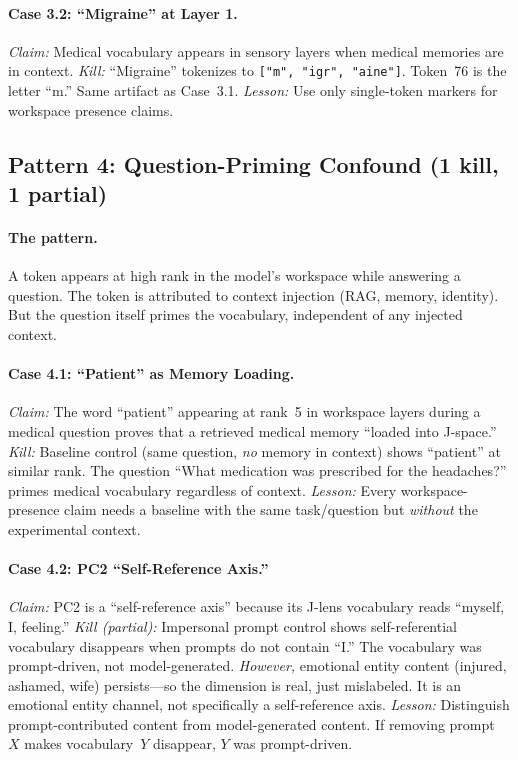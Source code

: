 \documentclass[11pt,a4paper]{article}
\begin{document}
\paragraph{Case 3.2: ``Migraine'' at Layer 1.}
\emph{Claim:} Medical vocabulary appears in sensory layers when medical
memories are in context.
\emph{Kill:} ``Migraine'' tokenizes to \texttt{["m", "igr", "aine"]}.
Token~76 is the letter ``m.'' Same artifact as Case~3.1.
\emph{Lesson:} Use only single-token markers for workspace presence
claims.

\subsection{Pattern 4: Question-Priming Confound (1 kill, 1 partial)}

\paragraph{The pattern.} A token appears at high rank in the model's
workspace while answering a question. The token is attributed to context
injection (RAG, memory, identity). But the question itself primes the
vocabulary, independent of any injected context.

\paragraph{Case 4.1: ``Patient'' as Memory Loading.}
\emph{Claim:} The word ``patient'' appearing at rank~5 in workspace
layers during a medical question proves that a retrieved medical memory
``loaded into J-space.''
\emph{Kill:} Baseline control (same question, \emph{no} memory in
context) shows ``patient'' at similar rank. The question ``What
medication was prescribed for the headaches?'' primes medical vocabulary
regardless of context.
\emph{Lesson:} Every workspace-presence claim needs a baseline with the
same task/question but \emph{without} the experimental context.

\paragraph{Case 4.2: PC2 ``Self-Reference Axis.''}
\emph{Claim:} PC2 is a ``self-reference axis'' because its J-lens
vocabulary reads ``myself, I, feeling.''
\emph{Kill (partial):} Impersonal prompt control shows self-referential
vocabulary disappears when prompts do not contain ``I.'' The vocabulary
was prompt-driven, not model-generated. \emph{However,} emotional entity
content (injured, ashamed, wife) persists---so the dimension is real,
just mislabeled. It is an emotional entity channel, not specifically a
self-reference axis.
\emph{Lesson:} Distinguish prompt-contributed content from
model-generated content. If removing prompt~$X$ makes vocabulary~$Y$
disappear, $Y$ was prompt-driven.
\end{document}
